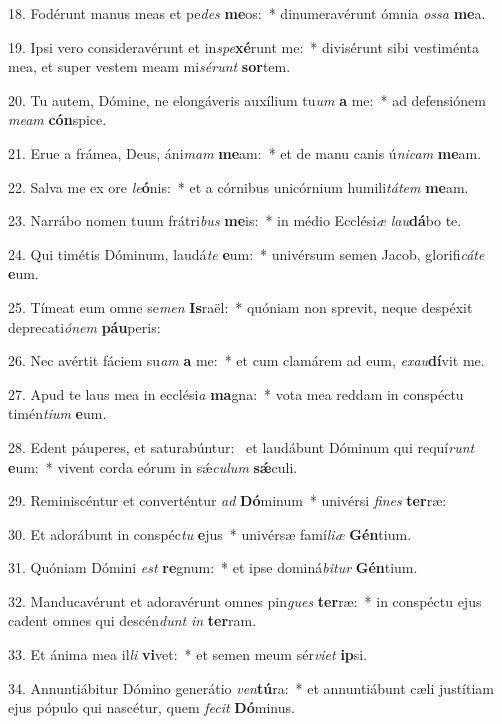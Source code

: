18. Fodérunt manus meas et pe\textit{des} \textbf{me}os:~*  dinumeravérunt ómnia \textit{os}\textit{sa} \textbf{me}a.\

19. Ipsi vero consideravérunt et in\textit{spe}\textbf{xé}runt me:~*  divisérunt sibi vestiménta mea, et super vestem meam mi\textit{sé}\textit{runt} \textbf{sor}tem.\

20. Tu autem, Dómine, ne elongáveris auxílium tu\textit{um} \textbf{a} me:~*  ad defensiónem \textit{me}\textit{am} \textbf{cón}spice.\

21. Erue a frámea, Deus, áni\textit{mam} \textbf{me}am:~*  et de manu canis ú\textit{ni}\textit{cam} \textbf{me}am.\

22. Salva me ex ore \textit{le}\textbf{ó}nis:~*  et a córnibus unicórnium humili\textit{tá}\textit{tem} \textbf{me}am.\

23. Narrábo nomen tuum frátri\textit{bus} \textbf{me}is:~*  in médio Ecclési\textit{æ} \textit{lau}\textbf{dá}bo te.\

24. Qui timétis Dóminum, laudá\textit{te} \textbf{e}um:~*  univérsum semen Jacob, glorifi\textit{cá}\textit{te} \textbf{e}um.\

25. Tímeat eum omne se\textit{men} \textbf{Is}raël:~*  quóniam non sprevit, neque despéxit deprecati\textit{ó}\textit{nem} \textbf{páu}peris:\

26. Nec avértit fáciem su\textit{am} \textbf{a} me:~*  et cum clamárem ad eum, \textit{ex}\textit{au}\textbf{dí}vit me.\

27. Apud te laus mea in ecclési\textit{a} \textbf{ma}gna:~*  vota mea reddam in conspéctu timén\textit{ti}\textit{um} \textbf{e}um.\

28. Edent páuperes, et saturabúntur: \dag\  et laudábunt Dóminum qui requí\textit{runt} \textbf{e}um:~*  vivent corda eórum in sǽ\textit{cu}\textit{lum} \textbf{sǽ}culi.\

29. Reminiscéntur et converténtur \textit{ad} \textbf{Dó}minum~*  univérsi \textit{fi}\textit{nes} \textbf{ter}ræ:\

30. Et adorábunt in conspéc\textit{tu} \textbf{e}jus~*  univérsæ famí\textit{li}\textit{æ} \textbf{Gén}tium.\

31. Quóniam Dómini \textit{est} \textbf{re}gnum:~*  et ipse dominá\textit{bi}\textit{tur} \textbf{Gén}tium.\

32. Manducavérunt et adoravérunt omnes pin\textit{gues} \textbf{ter}ræ:~*  in conspéctu ejus cadent omnes qui descén\textit{dunt} \textit{in} \textbf{ter}ram.\

33. Et ánima mea il\textit{li} \textbf{vi}vet:~*  et semen meum sér\textit{vi}\textit{et} \textbf{ip}si.\

34. Annuntiábitur Dómino generátio \textit{ven}\textbf{tú}ra:~*  et annuntiábunt cæli justítiam ejus pópulo qui nascétur, quem \textit{fe}\textit{cit} \textbf{Dó}minus.\

